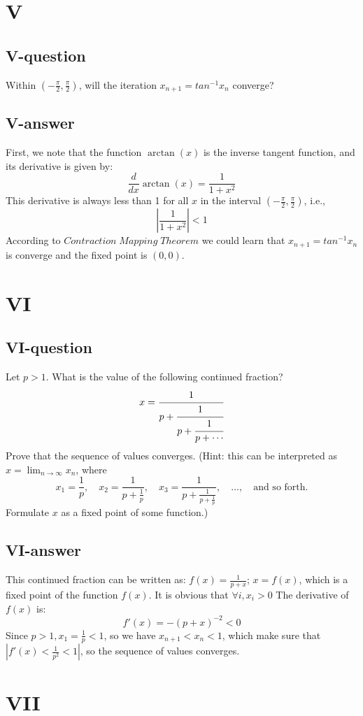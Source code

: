 \documentclass[a4paper]{article}
\begin{document}
\section*{V}
\subsection*{V-question}
Within $(-\frac{\pi }{2},\frac{\pi }{2})$, will the iteration $x_{n+1} = tan^{-1} x_n$ converge?

\subsection*{V-answer}
First, we note that the function \(\arctan(x)\) is the inverse tangent function, and its derivative is given by:
\[
\frac{d}{dx} \arctan(x) = \frac{1}{1+x^2}
\]
This derivative is always less than 1 for all \(x\) in the interval \((-\frac{\pi}{2}, \frac{\pi}{2})\), i.e.,
\[
\left|\frac{1}{1+x^2}\right| < 1
\]
According to $Contraction \; Mapping \; Theorem$ we could learn that $x_{n+1} = tan^{-1} x_n$ is converge and the fixed point is $(0,0)$.

\section*{VI}
\subsection*{VI-question}
Let \( p > 1 \). What is the value of the following continued fraction?
\[
x =  \cfrac{1}{p + \cfrac{1}{p  + \cfrac{1}{p + \cdots}}}
\]
Prove that the sequence of values converges. (Hint: this can be interpreted as \( x = \lim_{n \to \infty} x_n \), where
\[
x_1 = \frac{1}{p}, \quad x_2 = \frac{1}{p + \frac{1}{p}}, \quad x_3 = \frac{1}{p + \frac{1}{p+\frac{1}{p}}}, \quad \ldots, \quad \text{and so forth.}
\]
Formulate \( x \) as a fixed point of some function.)
\subsection*{VI-answer}
This continued fraction can be written as: $f(x) = \frac{1}{p+x}$; $x = f(x)$, which is a fixed point of the function $f(x)$. 
It is obvious that $\forall i,{x_i}>0$
The derivative of $f(x)$ is:
$$f'(x) = -(p+x)^{-2}<0$$ Since $p>1,x_1 = \frac{1}{p}<1$,
so we have $x_{n+1}<x_n<1$, which make sure that $|f'(x)<\frac{1}{p^{2}}<1|$,
so the sequence of values converges.

\section*{VII}
\end{document}
